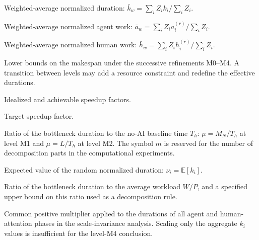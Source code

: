 \begin{description}[style=nextline]
  \item[$\bar{k}_w$] Weighted-average normalized duration:
  $\bar{k}_w=\sum_i Z_i k_i/\sum_i Z_i$.

  \item[$\bar{a}_w$] Weighted-average normalized agent work:
  $\bar{a}_w=\sum_i Z_i a_i^{(r)}/\sum_i Z_i$.

  \item[$\bar{h}_w$] Weighted-average normalized human work:
  $\bar{h}_w=\sum_i Z_i h_i^{(r)}/\sum_i Z_i$.

  \item[$B_0,\dots,B_4$] Lower bounds on the makespan under the successive
  refinements M0--M4. A transition between levels may add a resource constraint
  and redefine the effective durations.

  \item[$S_E$, $S_E^{\mathrm{ach}}$] Idealized and achievable speedup factors.

  \item[$S_{\mathrm{target}}$] Target speedup factor.

  \item[$\mu$] Ratio of the bottleneck duration to the no-AI baseline time
  $T_h$: $\mu=M_N/T_h$ at level M1 and $\mu=L/T_h$ at level M2. The symbol $m$
  is reserved for the number of decomposition parts in the computational
  experiments.

  \item[$\nu_i$] Expected value of the random normalized duration:
  $\nu_i=\mathbb{E}[k_i]$.

  \item[$b$, $b_0$] Ratio of the bottleneck duration to the average workload
  $W/P$, and a specified upper bound on this ratio used as a decomposition rule.

  \item[$\kappa$] Common positive multiplier applied to the durations of all
  agent and human-attention phases in the scale-invariance analysis. Scaling
  only the aggregate $k_i$ values is insufficient for the level-M4 conclusion.
\end{description}
